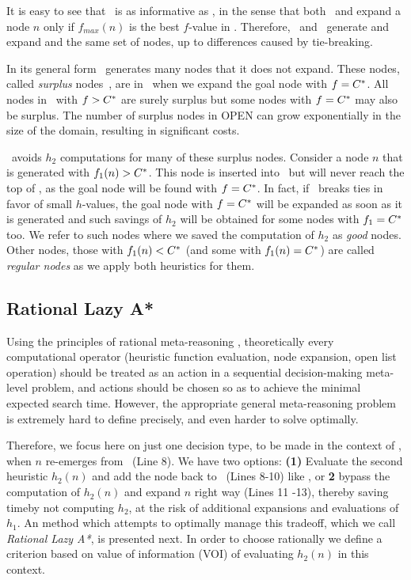 It is easy to see that \lazyastar~is as informative as \astarmax, in
the sense that both \astarmax~and \lazyastar expand a node $n$ only
if $f_{max}(n)$ is the best $f$-value in \OPEN.  Therefore,
\lazyastar~and \astarmax~generate and expand and the same set of
nodes, up to differences caused by tie-breaking.

In its general form \astar~generates many nodes that it does not expand. These
nodes, called {\em surplus} nodes~\cite{Felner2012}, are in \OPEN~when we
expand the goal node with $f=C^\ast$. All nodes in \OPEN~with $f>C^\ast$ are
surely surplus but some nodes with $f=C^\ast$ may also be surplus. The number
of surplus nodes in OPEN can grow exponentially in the size of the domain, resulting in
significant costs.

\lazyastar~avoids $h_2$ computations for many of these surplus nodes. Consider
a node $n$ that is generated with $f_1(n) > C^\ast$. This node is inserted
into \OPEN~but will never reach the top of \OPEN, as the goal node will be found
with $f=C^\ast$. In fact, if \OPEN~breaks ties in favor of small $h$-values,
the goal node with $f=C^\ast$ will be expanded as soon as it is generated and such
savings of $h_2$ will be obtained for some nodes with $f_1=C^\ast$ too. We
refer to such nodes where we saved the computation of $h_2$ as {\em good} nodes. Other nodes,
those with $f_1(n) < C^\ast$ (and some with $f_1(n) = C^\ast$) are called
{\em regular nodes} as we apply both heuristics for them.

\subsection{Rational Lazy A*}

Using the principles of rational meta-reasoning \cite{Russell.right},
theoretically every computational operator (heuristic function evaluation, node
expansion, open list operation) should be treated as an action in a sequential
decision-making meta-level problem, and actions should be chosen so as to
achieve the minimal expected search time. However, the appropriate
general meta-reasoning problem is extremely hard to define precisely, and even harder
to solve optimally.

Therefore, we focus here on just one decision type, to be
made in the context of \lazyastar, when $n$ re-emerges from \OPEN~(Line 8).
We have two options: {\bf (1)}  Evaluate the second heuristic $h_2(n)$ and add
the node back to \OPEN~(Lines 8-10) like \lazyastar, or {\bf 2} bypass the
computation of $h_2(n)$ and expand $n$ right way (Lines 11 -13), thereby
saving timeby not computing $h_2$, at the risk of additional expansions and evaluations of $h_1$.
An method which attempts to
optimally manage this tradeoff, which we call \textit{Rational Lazy A*}, is presented next.
In order to choose rationally we define a criterion based on value of
information (VOI) of evaluating $h_2(n)$ in this context.

